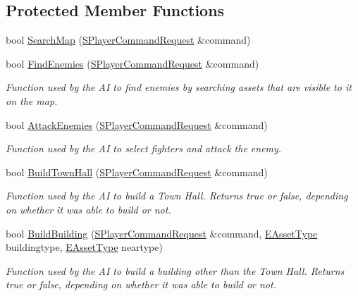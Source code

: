\subsection*{Protected Member Functions}
\begin{DoxyCompactItemize}
\item 
bool \hyperlink{classCAIPlayer_afafbe8fc589e09a16ae1f02f2794d7b0}{Search\+Map} (\hyperlink{structSPlayerCommandRequest}{S\+Player\+Command\+Request} \&command)
\item 
bool \hyperlink{classCAIPlayer_a33b1533570e7a00114d1b85b3551e395}{Find\+Enemies} (\hyperlink{structSPlayerCommandRequest}{S\+Player\+Command\+Request} \&command)
\begin{DoxyCompactList}\small\item\em Function used by the AI to find enemies by searching assets that are visible to it on the map. \end{DoxyCompactList}\item 
bool \hyperlink{classCAIPlayer_adf7feeba7debf9f19b000887616d7bfb}{Attack\+Enemies} (\hyperlink{structSPlayerCommandRequest}{S\+Player\+Command\+Request} \&command)
\begin{DoxyCompactList}\small\item\em Function used by the AI to select fighters and attack the enemy. \end{DoxyCompactList}\item 
bool \hyperlink{classCAIPlayer_a41cdefbe14210fb70b793a32778c5141}{Build\+Town\+Hall} (\hyperlink{structSPlayerCommandRequest}{S\+Player\+Command\+Request} \&command)
\begin{DoxyCompactList}\small\item\em Function used by the AI to build a Town Hall. Returns true or false, depending on whether it was able to build or not. \end{DoxyCompactList}\item 
bool \hyperlink{classCAIPlayer_a2ff5263cbaa6bfc62ffec4dbce87ba88}{Build\+Building} (\hyperlink{structSPlayerCommandRequest}{S\+Player\+Command\+Request} \&command, \hyperlink{GameDataTypes_8h_a5600d4fc433b83300308921974477fec}{E\+Asset\+Type} buildingtype, \hyperlink{GameDataTypes_8h_a5600d4fc433b83300308921974477fec}{E\+Asset\+Type} neartype)
\begin{DoxyCompactList}\small\item\em Function used by the AI to build a building other than the Town Hall. Returns true or false, depending on whether it was able to build or not. \end{DoxyCompactList}\item 

\end{DoxyCompactItemize}
